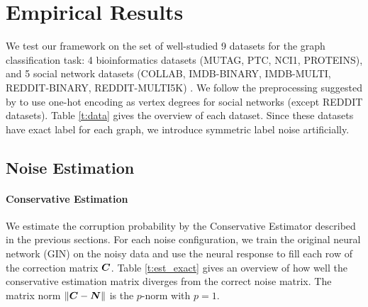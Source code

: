 \documentclass{article} %
\newcommand{\norm}[1]{\left\lVert#1\right\rVert}
\begin{document}
\section{Empirical Results}

We test our framework on the set of well-studied 9 datasets for the graph 
classification task: 4 bioinformatics datasets (MUTAG, PTC, NCI1, PROTEINS),
and 5 social network datasets (COLLAB, IMDB-BINARY, IMDB-MULTI, REDDIT-BINARY, REDDIT-MULTI5K)
\citep{yanardag2015deep}. We follow the preprocessing suggested by \cite{xu2018how} 
to use one-hot encoding as vertex degrees for social networks (except REDDIT datasets). 
Table \ref{t:data} gives the overview of each dataset. Since these datasets have exact 
label for each graph, we introduce symmetric label noise artificially.

\begin{table}
\vspace{-1em}
\caption{Data overview}
\label{t:data}
\vspace{-2em}
\end{table}

\subsection{Noise Estimation}

\paragraph{Conservative Estimation} We estimate the corruption probability by
the Conservative Estimator described in the previous sections. For each noise 
configuration, we train the original neural network (GIN) on the
noisy data and use the neural response to fill each row of the correction 
matrix ${\bm{C}}$. Table \ref{t:est_exact} gives an overview of how well the 
conservative estimation matrix diverges from the correct noise matrix.
The matrix norm $\norm{\mC-\mN}$ is the $p$-norm with $p=1$.
\end{document}
